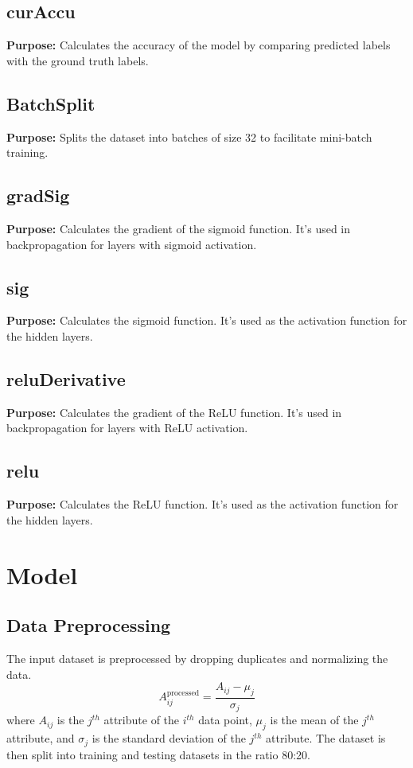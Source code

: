 \documentclass[12pt]{article}
\begin{document}
	\subsection{curAccu}
	\textbf{Purpose:} Calculates the accuracy of the model by comparing predicted labels with the ground truth labels.
	
	\subsection{BatchSplit}
	\textbf{Purpose:} Splits the dataset into batches of size 32 to facilitate mini-batch training.
	
	\subsection{gradSig}
	\textbf{Purpose:} Calculates the gradient of the sigmoid function. It's used in backpropagation for layers with sigmoid activation.
	
	\subsection{sig}
	\textbf{Purpose:} Calculates the sigmoid function. It's used as the activation function for the hidden layers.
	
	\subsection{reluDerivative}
	\textbf{Purpose:} Calculates the gradient of the ReLU function. It's used in backpropagation for layers with ReLU activation.
	
	\subsection{relu}
	\textbf{Purpose:} Calculates the ReLU function. It's used as the activation function for the hidden layers.
	

\section{Model} \label{sec:model}
\subsection{Data Preprocessing}
The input dataset is preprocessed by dropping duplicates and normalizing the data. 
\[
	A_{ij}^{\mathrm{processed}} = \frac{A_{ij} - \mu_j}{\sigma_j}	
\]
where $A_{ij}$ is the $j^{th}$ attribute of the $i^{th}$ data point, $\mu_j$ is the mean of the $j^{th}$ attribute, and $\sigma_j$ is the standard deviation of the $j^{th}$ attribute.
The dataset is then split into training and testing datasets in the ratio 80:20.
\end{document}
